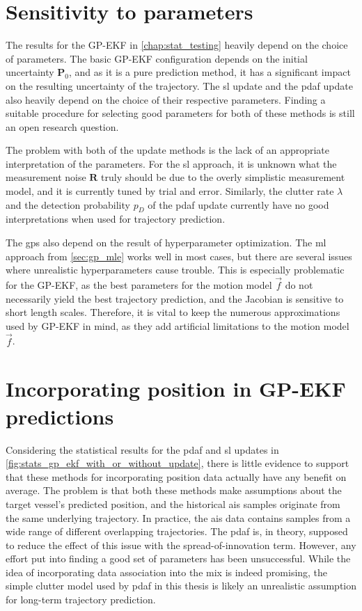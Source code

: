 \section{Sensitivity to parameters}
The results for the GP-EKF in \cref{chap:stat_testing} heavily depend on the choice of parameters. The basic GP-EKF configuration depends on the initial uncertainty $\boldsymbol{P}_0$, and as it is a pure prediction method, it has a significant impact on the resulting uncertainty of the trajectory. The \acrshort{sl} update and the \acrshort{pdaf} update also heavily depend on the choice of their respective parameters. Finding a suitable procedure for selecting good parameters for both of these methods is still an open research question. 

The problem with both of the update methods is the lack of an appropriate interpretation of the parameters. For the \acrshort{sl} approach, it is unknown what the measurement noise $\boldsymbol{R}$ truly should be due to the overly simplistic measurement model, and it is currently tuned by trial and error. Similarly, the clutter rate $\lambda$ and the detection probability $p_D$ of the \acrshort{pdaf} update currently have no good interpretations when used for trajectory prediction. 

The \acrshort{gp}s also depend on the result of hyperparameter optimization. The \acrshort{ml} approach from \cref{sec:gp_mle} works well in most cases, but there are several issues where unrealistic hyperparameters cause trouble. This is especially problematic for the GP-EKF, as the best parameters for the motion model $\vec{f}$ do not necessarily yield the best trajectory prediction, and the Jacobian is sensitive to short length scales. Therefore, it is vital to keep the numerous approximations used by GP-EKF in mind, as they add artificial limitations to the motion model $\vec{f}$.

\section{Incorporating position in GP-EKF predictions}
Considering the statistical results for the \acrshort{pdaf} and \acrshort{sl} updates in \cref{fig:stats_gp_ekf_with_or_without_update}, there is little evidence to support that these methods for incorporating position data actually have any benefit on average. The problem is that both these methods make assumptions about the target vessel's predicted position, and the historical \acrshort{ais} samples originate from the same underlying trajectory. In practice, the \acrshort{ais} data contains samples from a wide range of different overlapping trajectories. The \acrshort{pdaf} is, in theory, supposed to reduce the effect of this issue with the spread-of-innovation term. However, any effort put into finding a good set of parameters has been unsuccessful. While the idea of incorporating data association into the mix is indeed promising, the simple clutter model used by \acrshort{pdaf} in this thesis is likely an unrealistic assumption for long-term trajectory prediction. 


